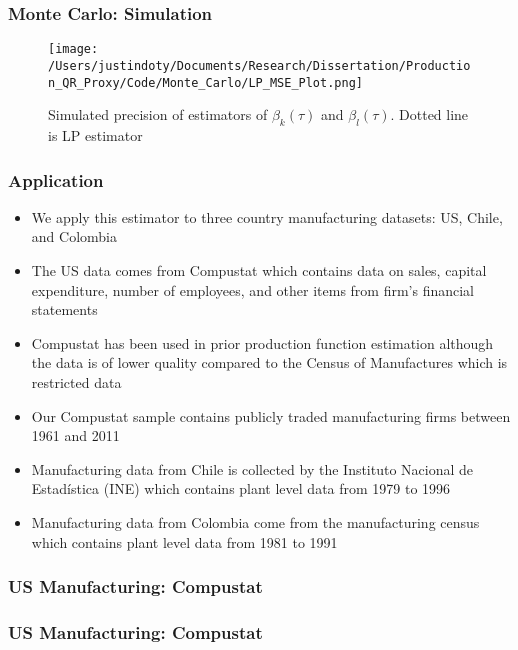 \documentclass{beamer}
\begin{document}
\begin{frame}
\frametitle{Monte Carlo: Simulation}
\begin{figure}[H]
\centering
\caption{Simulated precision of estimators of $\beta_{k}(\tau)$ and $\beta_{l}(\tau)$. Dotted line is LP estimator}
\texttt{[image: /Users/justindoty/Documents/Research/Dissertation/Production\_QR\_Proxy/Code/Monte\_Carlo/LP\_MSE\_Plot.png]}
\end{figure}
\end{frame}



\begin{frame}
\frametitle{Application}
\begin{itemize}
	\item We apply this estimator to three country manufacturing datasets: US, Chile, and Colombia
	\item The US data comes from Compustat which contains data on sales, capital expenditure, number of employees, and other items from firm's financial statements
	\item Compustat has been used in prior production function estimation although the data is of lower quality compared to the Census of Manufactures which is restricted data
	\item Our Compustat sample contains publicly traded manufacturing firms between 1961 and 2011
	\item Manufacturing data from Chile is collected by the Instituto Nacional de Estad\'{i}stica (INE) which contains plant level data from 1979 to 1996
	\item Manufacturing data from Colombia come from the manufacturing census which contains plant level data from 1981 to 1991 
\end{itemize}
\end{frame}


\begin{frame}
\frametitle{US Manufacturing: Compustat}
\scriptsize

\end{frame}

\begin{frame}
\frametitle{US Manufacturing: Compustat}
\scriptsize

\end{frame}
\end{document}
